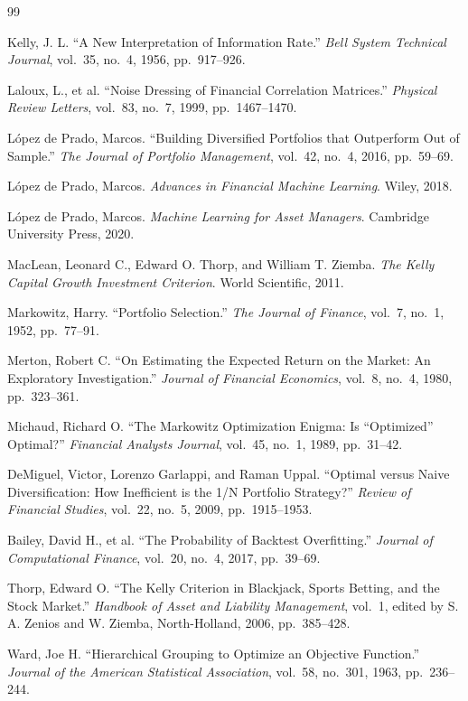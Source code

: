 \documentclass[11pt,a4paper]{article}
\begin{document}

\begin{thebibliography}{99}

Kelly, J. L. ``A New Interpretation of Information Rate.''
\textit{Bell System Technical Journal}, vol.~35, no.~4, 1956, pp.~917--926.

Laloux, L., et al. ``Noise Dressing of Financial Correlation Matrices.''
\textit{Physical Review Letters}, vol.~83, no.~7, 1999, pp.~1467--1470.

L\'{o}pez de Prado, Marcos.
``Building Diversified Portfolios that Outperform Out of Sample.''
\textit{The Journal of Portfolio Management}, vol.~42, no.~4, 2016, pp.~59--69.

L\'{o}pez de Prado, Marcos.
\textit{Advances in Financial Machine Learning}.
Wiley, 2018.

L\'{o}pez de Prado, Marcos.
\textit{Machine Learning for Asset Managers}.
Cambridge University Press, 2020.

MacLean, Leonard C., Edward O. Thorp, and William T. Ziemba.
\textit{The Kelly Capital Growth Investment Criterion}.
World Scientific, 2011.

Markowitz, Harry. ``Portfolio Selection.''
\textit{The Journal of Finance}, vol.~7, no.~1, 1952, pp.~77--91.

Merton, Robert C.
``On Estimating the Expected Return on the Market: An Exploratory Investigation.''
\textit{Journal of Financial Economics}, vol.~8, no.~4, 1980, pp.~323--361.

Michaud, Richard O.
``The Markowitz Optimization Enigma: Is ``Optimized'' Optimal?''
\textit{Financial Analysts Journal}, vol.~45, no.~1, 1989, pp.~31--42.

DeMiguel, Victor, Lorenzo Garlappi, and Raman Uppal.
``Optimal versus Naive Diversification: How Inefficient is the 1/N Portfolio Strategy?''
\textit{Review of Financial Studies}, vol.~22, no.~5, 2009, pp.~1915--1953.

Bailey, David H., et al.
``The Probability of Backtest Overfitting.''
\textit{Journal of Computational Finance}, vol.~20, no.~4, 2017, pp.~39--69.

Thorp, Edward O. ``The Kelly Criterion in Blackjack, Sports Betting, and the
Stock Market.''
\textit{Handbook of Asset and Liability Management}, vol.~1,
edited by S. A. Zenios and W. Ziemba,
North-Holland, 2006, pp.~385--428.

Ward, Joe H.
``Hierarchical Grouping to Optimize an Objective Function.''
\textit{Journal of the American Statistical Association}, vol.~58, no.~301, 1963, pp.~236--244.

\end{thebibliography}
\end{document}
